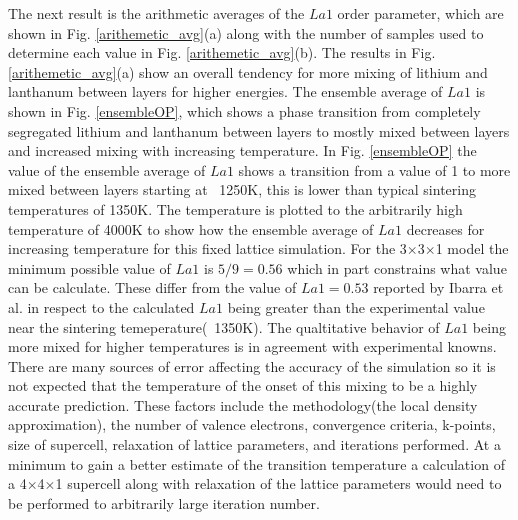 \documentclass[aps,pre,reprint,superscriptaddress,showkeys]{revtex4-2}
\begin{document}
The next result is the arithmetic averages of the $La1$  order parameter, which are  shown in Fig. \ref{arithemetic_avg}(a) along with the number of samples used to determine each value in Fig. \ref{arithemetic_avg}(b). The results in Fig. \ref{arithemetic_avg}(a) show an overall tendency for more mixing of lithium and lanthanum between layers for higher energies. The ensemble average of $La1$ is shown in Fig. \ref{ensembleOP}, which shows a phase transition from completely segregated lithium and lanthanum between layers to mostly mixed between layers and increased mixing with increasing temperature. In Fig. \ref{ensembleOP} the value of the ensemble average of $La1$ shows a transition from a value of 1 to more mixed between layers starting at ~1250K, this is lower than typical sintering temperatures of 1350K. The temperature is plotted to the arbitrarily high temperature of 4000K to show how the ensemble average of $La1$ decreases for increasing temperature for this fixed lattice simulation. For the 3$\times$3$\times$1 model the minimum possible value of $La1$ is $5/9 = 0.56$ which in part constrains what value can be calculate. These differ from the value of $La1=0.53$ reported by Ibarra et al. \cite{P4mmmstrucuture}  in respect to the calculated $La1$ being greater than the  experimental value near the sintering temeperature(~1350K). The qualtitative behavior of $La1$ being more mixed for higher temperatures is in agreement with experimental knowns. There are many sources of error affecting the accuracy of the simulation so it is not expected that the temperature of the onset of this mixing to be a highly accurate prediction.  These factors include the methodology(the local density approximation), the number of valence electrons, convergence criteria, k-points, size of supercell, relaxation of lattice parameters,  and iterations performed.  At a minimum to gain a better estimate of the transition temperature a calculation of a 4$\times$4$\times$1 supercell along with relaxation of the lattice parameters would need to be performed to arbitrarily large iteration number. 
\end{document}
